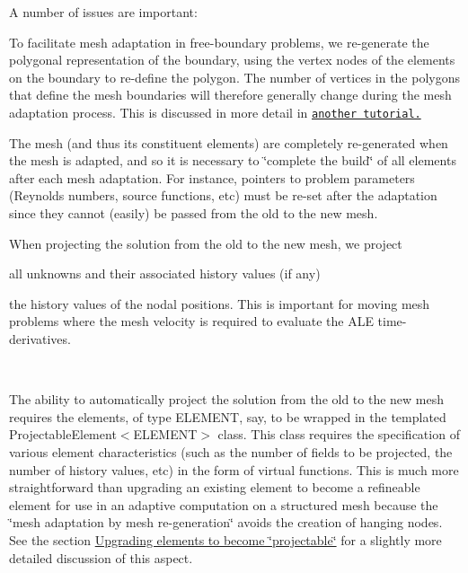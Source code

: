 A number of issues are important\+:
\begin{DoxyItemize}
\item To facilitate mesh adaptation in free-\/boundary problems, we re-\/generate the polygonal representation of the boundary, using the vertex nodes of the elements on the boundary to re-\/define the polygon. The number of vertices in the polygons that define the mesh boundaries will therefore generally change during the mesh adaptation process. This is discussed in more detail in \href{../../../../doc/navier_stokes/adaptive_bubble_in_channel/html/index.html#adapt}{\tt another tutorial.}~\newline
~\newline

\item The mesh (and thus its constituent elements) are completely re-\/generated when the mesh is adapted, and so it is necessary to \char`\"{}complete
  the build\char`\"{} of all elements after each mesh adaptation. For instance, pointers to problem parameters (Reynolds numbers, source functions, etc) must be re-\/set after the adaptation since they cannot (easily) be passed from the old to the new mesh. ~\newline
~\newline

\item When projecting the solution from the old to the new mesh, we project ~\newline
~\newline

\begin{DoxyItemize}
\item all unknowns and their associated history values (if any) ~\newline
~\newline

\item the history values of the nodal positions. This is important for moving mesh problems where the mesh velocity is required to evaluate the A\+LE time-\/derivatives.
\end{DoxyItemize}~\newline
~\newline

\item The ability to automatically project the solution from the old to the new mesh requires the elements, of type {\ttfamily E\+L\+E\+M\+E\+NT}, say, to be wrapped in the templated {\ttfamily Projectable\+Element$<$\+E\+L\+E\+M\+E\+N\+T$>$} class. This class requires the specification of various element characteristics (such as the number of fields to be projected, the number of history values, etc) in the form of virtual functions. This is much more straightforward than upgrading an existing element to become a refineable element for use in an adaptive computation on a structured mesh because the \char`\"{}mesh adaptation by mesh re-\/generation\char`\"{} avoids the creation of hanging nodes. See the section \hyperlink{index_wrapper}{Upgrading elements to become \char`\"{}projectable\char`\"{}} for a slightly more detailed discussion of this aspect. ~\newline
~\newline


\end{DoxyItemize}
